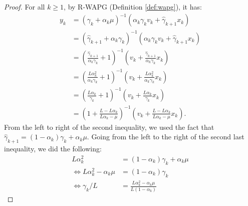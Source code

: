 \documentclass[12pt]{article}
\begin{document}
        \begin{proof}
            For all $k \ge 1$, by R-WAPG (Definition \ref{def:wapg}), it has: 
            \begin{align*}
                y_{k} &= 
                (\gamma_k + \alpha_k \mu)^{-1}
                (\alpha_k \gamma_k v_k + \hat \gamma_{k + 1}x_k)
                \\
                &= 
                (\hat \gamma_{k + 1} + \alpha_k \gamma_k)^{-1}
                (\alpha_k \gamma_k v_k + \hat \gamma_{k + 1}x_k)
                \\
                &= 
                \left(
                    \frac{\hat \gamma_{k + 1}}{\alpha_k\gamma_k} + 1
                \right)^{-1}
                \left(
                    v_k + \frac{\hat \gamma_{k + 1}}{\alpha_k \gamma_k} x_k
                \right)
                \\
                &= 
                \left(
                    \frac{L\alpha_k^2}{\alpha_k\gamma_k} + 1
                \right)^{-1}
                \left(
                    v_k + \frac{L\alpha_k^2}{\alpha_k \gamma_k} x_k
                \right)
                \\
                &= 
                \left(
                    \frac{L\alpha_k}{\gamma_k} + 1
                \right)^{-1}
                \left(
                    v_k + \frac{L\alpha_k}{ \gamma_k} x_k
                \right)
                \\
                &= 
                \left(
                    1 + \frac{L - L \alpha_k}{L \alpha_k - \mu}
                \right)^{-1}
                \left(
                    v_k + 
                    \frac{L - L \alpha_k}{L \alpha_k - \mu} x_k
                \right). 
            \end{align*}
            From the left to right of the second inequality, we used the fact that $\hat \gamma_{k + 1} = (1 - \alpha_k)\gamma_k + \alpha_k\mu$. 
            Going from the left to the right of the second last inequality, we did the following: 
            \begin{align*}
                L\alpha_k^2 &= 
                (1 - \alpha_k)\gamma_k + \alpha_k \mu 
                \\
                \iff 
                L \alpha_k^2 - \alpha_k\mu &= 
                (1 - \alpha_k)\gamma_k
                \\
                \iff 
                \gamma_k/L
                &= 
                \frac{L \alpha_k^2 - \alpha_k\mu}{L (1 - \alpha_k)}

\end{align*}
\end{proof}
\end{document}
